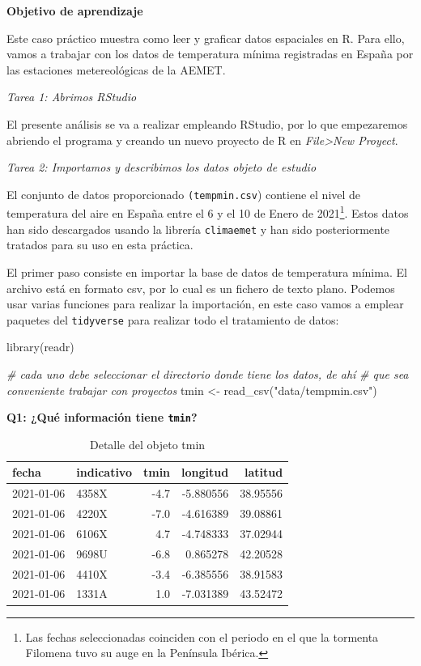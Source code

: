 \documentclass[
]{book}
\newenvironment{Shaded}{\begin{snugshade}}{\end{snugshade}}
\newcommand{\CommentTok}[1]{\textcolor[rgb]{0.56,0.35,0.01}{\textit{#1}}}
\newcommand{\FunctionTok}[1]{\textcolor[rgb]{0.00,0.00,0.00}{#1}}
\newcommand{\NormalTok}[1]{#1}
\newcommand{\OtherTok}[1]{\textcolor[rgb]{0.56,0.35,0.01}{#1}}
\newcommand{\StringTok}[1]{\textcolor[rgb]{0.31,0.60,0.02}{#1}}
\begin{document}
\textbf{Objetivo de aprendizaje}

Este caso práctico muestra como leer y graficar datos espaciales en R. Para
ello, vamos a trabajar con los datos de temperatura mínima registradas en España
por las estaciones metereológicas de la AEMET.

\emph{Tarea 1: Abrimos RStudio}

El presente análisis se va a realizar empleando RStudio, por lo que empezaremos
abriendo el programa y creando un nuevo proyecto de R en \emph{File\textgreater New Proyect}.

\emph{Tarea 2: Importamos y describimos los datos objeto de estudio}

El conjunto de datos proporcionado \texttt{(tempmin.csv}) contiene el nivel de
temperatura del aire en España entre el 6 y el 10 de Enero de
2021\footnote{Las fechas seleccionadas coinciden con el periodo en el que
  la tormenta Filomena tuvo su auge en la Península Ibérica.}. Estos datos han sido descargados usando la librería
\texttt{climaemet} \citep{R-climaemet} y han sido posteriormente tratados para su uso en
esta práctica.

El primer paso consiste en importar la base de datos de temperatura mínima. El
archivo está en formato csv, por lo cual es un fichero de texto plano. Podemos
usar varias funciones para realizar la importación, en este caso vamos a emplear
paquetes del \texttt{tidyverse} para realizar todo el tratamiento de datos:

\begin{Shaded}
\begin{Highlighting}[]

\FunctionTok{library}\NormalTok{(readr)}

\CommentTok{\# cada uno debe seleccionar el directorio donde tiene los datos, de ahí}
\CommentTok{\# que sea conveniente trabajar con proyectos}
\NormalTok{tmin }\OtherTok{\textless{}{-}} \FunctionTok{read\_csv}\NormalTok{(}\StringTok{"data/tempmin.csv"}\NormalTok{)}
\end{Highlighting}
\end{Shaded}

\textbf{Q1: ¿Qué información tiene \texttt{tmin}?}

\begin{table}

\caption{\label{tab:tmin-head}Detalle del objeto tmin}
\centering
\begin{tabular}[t]{l|l|r|r|r}
\hline
fecha & indicativo & tmin & longitud & latitud\\
\hline
2021-01-06 & 4358X & -4.7 & -5.880556 & 38.95556\\
\hline
2021-01-06 & 4220X & -7.0 & -4.616389 & 39.08861\\
\hline
2021-01-06 & 6106X & 4.7 & -4.748333 & 37.02944\\
\hline
2021-01-06 & 9698U & -6.8 & 0.865278 & 42.20528\\
\hline
2021-01-06 & 4410X & -3.4 & -6.385556 & 38.91583\\
\hline
2021-01-06 & 1331A & 1.0 & -7.031389 & 43.52472\\
\hline
\end{tabular}
\end{table}
\end{document}

